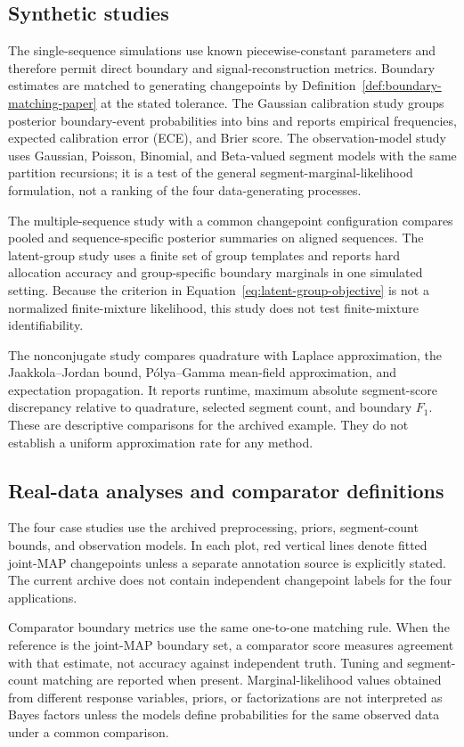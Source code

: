 \subsection{Synthetic studies}
The single-sequence simulations use known piecewise-constant parameters and therefore permit direct boundary and signal-reconstruction metrics. Boundary estimates are matched to generating changepoints by Definition~\ref{def:boundary-matching-paper} at the stated tolerance. The Gaussian calibration study groups posterior boundary-event probabilities into bins and reports empirical frequencies, expected calibration error (ECE), and Brier score. The observation-model study uses Gaussian, Poisson, Binomial, and Beta-valued segment models with the same partition recursions; it is a test of the general segment-marginal-likelihood formulation, not a ranking of the four data-generating processes.

The multiple-sequence study with a common changepoint configuration compares pooled and sequence-specific posterior summaries on aligned sequences. The latent-group study uses a finite set of group templates and reports hard allocation accuracy and group-specific boundary marginals in one simulated setting. Because the criterion in Equation~\eqref{eq:latent-group-objective} is not a normalized finite-mixture likelihood, this study does not test finite-mixture identifiability.

The nonconjugate study compares quadrature with Laplace approximation, the Jaakkola--Jordan bound, P\'olya--Gamma mean-field approximation, and expectation propagation. It reports runtime, maximum absolute segment-score discrepancy relative to quadrature, selected segment count, and boundary $F_1$. These are descriptive comparisons for the archived example. They do not establish a uniform approximation rate for any method.

\subsection{Real-data analyses and comparator definitions}
The four case studies use the archived preprocessing, priors, segment-count bounds, and observation models. In each plot, red vertical lines denote fitted joint-MAP changepoints unless a separate annotation source is explicitly stated. The current archive does not contain independent changepoint labels for the four applications.

Comparator boundary metrics use the same one-to-one matching rule. When the reference is the \BayesBreak joint-MAP boundary set, a comparator score measures agreement with that estimate, not accuracy against independent truth. Tuning and segment-count matching are reported when present. Marginal-likelihood values obtained from different response variables, priors, or factorizations are not interpreted as Bayes factors unless the models define probabilities for the same observed data under a common comparison.

